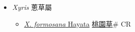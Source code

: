 
  \begin{itemize}
 \item[] \textit{Xyris} 蔥草屬
                    
  \begin{itemize}
        \item[] \href{http://www.theplantlist.org/tpl1.1/search?q=Xyris+formosana}{\textit{X. formosana} Hayata}   \href{\detokenize{http://taibnet.sinica.edu.tw/chi/taibnet_species_list.php?T2=桃園草&T2_new_value=true&fr=y}}{桃園草}\# CR
  \end{itemize}
  \end{itemize}
